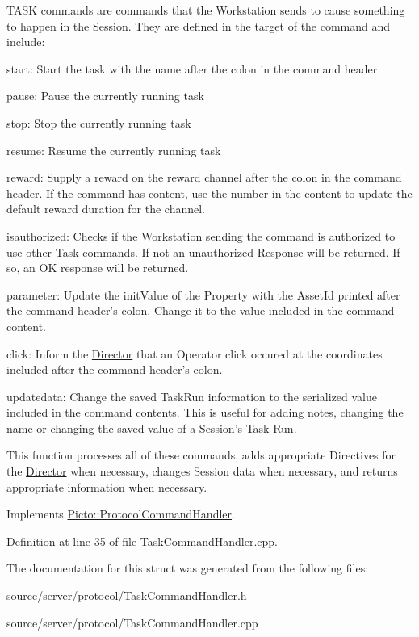 T\-A\-S\-K commands are commands that the Workstation sends to cause something to happen in the Session. They are defined in the target of the command and include\-:
\begin{DoxyItemize}
\item start\-: Start the task with the name after the colon in the command header
\item pause\-: Pause the currently running task
\item stop\-: Stop the currently running task
\item resume\-: Resume the currently running task
\item reward\-: Supply a reward on the reward channel after the colon in the command header. If the command has content, use the number in the content to update the default reward duration for the channel.
\item isauthorized\-: Checks if the Workstation sending the command is authorized to use other Task commands. If not an unauthorized Response will be returned. If so, an O\-K response will be returned.
\item parameter\-: Update the init\-Value of the Property with the Asset\-Id printed after the command header's colon. Change it to the value included in the command content.
\item click\-: Inform the \hyperlink{class_director}{Director} that an Operator click occured at the coordinates included after the command header's colon.
\item updatedata\-: Change the saved Task\-Run information to the serialized value included in the command contents. This is useful for adding notes, changing the name or changing the saved value of a Session's Task Run.
\end{DoxyItemize}

This function processes all of these commands, adds appropriate Directives for the \hyperlink{class_director}{Director} when necessary, changes Session data when necessary, and returns appropriate information when necessary. 

Implements \hyperlink{struct_picto_1_1_protocol_command_handler_aeeaa16fe40f10fd55996d74e16e29cad}{Picto\-::\-Protocol\-Command\-Handler}.



Definition at line 35 of file Task\-Command\-Handler.\-cpp.



The documentation for this struct was generated from the following files\-:\begin{DoxyCompactItemize}
\item 
source/server/protocol/Task\-Command\-Handler.\-h\item 
source/server/protocol/Task\-Command\-Handler.\-cpp\end{DoxyCompactItemize}
